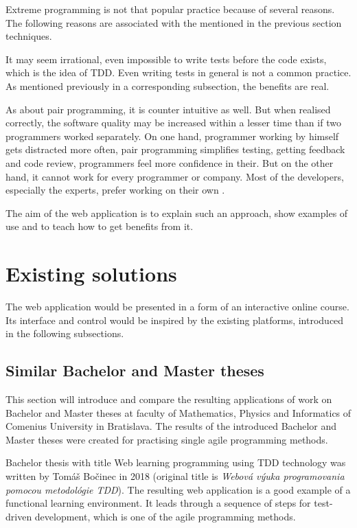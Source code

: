Extreme programming is not that popular practice because of several reasons. The following reasons are associated with the mentioned in the previous section techniques.

It may seem irrational, even impossible to write tests before the code exists, which is the idea of TDD. Even writing tests in general is not a common practice. As mentioned previously in a corresponding subsection, the benefits are real.

As about pair programming, it is counter intuitive as well. But when realised correctly, the software quality may be increased within a lesser time than if two programmers worked separately. On one hand, programmer working by himself gets distracted more often, pair programming simplifies testing, getting feedback and code review, programmers feel more confidence in their. But on the other hand, it cannot work for every programmer or company. Most of the developers, especially the experts, prefer working on their own \cite[Two by Two]{xp_howto}.

The aim of the web application is to explain such an approach, show examples of use and to teach how to get benefits from it.


\section{Existing solutions}
The web application would be presented in a form of an interactive online course. Its interface and control would be inspired by the existing platforms, introduced in the following subsections.

\subsection{Similar Bachelor and Master theses}
This section will introduce and compare the resulting applications of work on Bachelor and Master theses at faculty of Mathematics, Physics and Informatics of Comenius University in Bratislava. The results of the introduced Bachelor and Master theses were created for practising single agile programming methods.

Bachelor thesis with title Web learning programming using TDD technology was written by Tomáš Bočinec in 2018 (original title is \textit{Webová výuka programovania pomocou metodológie TDD}). The resulting web application is a good example of a functional learning environment. It leads through a sequence of steps for test-driven development, which is one of the agile programming methods.

